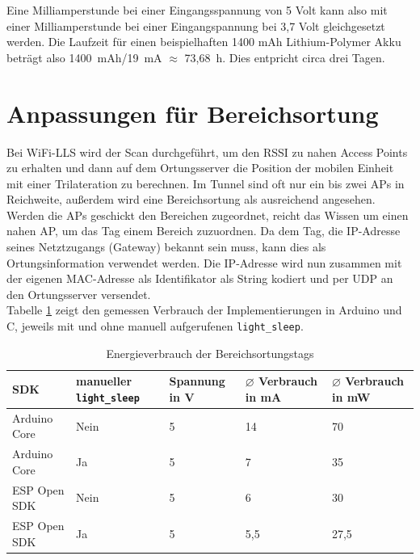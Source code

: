 Eine Milliamperstunde bei einer Eingangsspannung von 5 Volt kann also mit einer Milliamperstunde bei einer Eingangspannung bei 3,7 Volt gleichgesetzt werden.
Die Laufzeit für einen beispielhaften 1400 mAh Lithium-Polymer Akku beträgt also 1400\ mAh/19\ mA $\approx$ 73,68\ h.
Dies entpricht circa drei Tagen.


\section{Anpassungen für Bereichsortung}
\label{ch:phase1:sec:anpassungbereich}
Bei WiFi-LLS wird der Scan durchgeführt, um den RSSI zu nahen Access Points zu erhalten und dann auf dem Ortungsserver die Position der mobilen Einheit mit einer Trilateration zu berechnen.
Im Tunnel sind oft nur ein bis zwei APs in Reichweite, außerdem wird eine Bereichsortung als ausreichend angesehen. \\
Werden die APs geschickt den Bereichen zugeordnet, reicht das Wissen um einen nahen AP, um das Tag einem Bereich zuzuordnen.
Da dem Tag, die IP-Adresse seines Netztzugangs (Gateway) bekannt sein muss, kann dies als Ortungsinformation verwendet werden.
Die IP-Adresse wird nun zusammen mit der eigenen MAC-Adresse als Identifikator als String kodiert und per UDP an den Ortungsserver versendet.\\
Tabelle \ref{table:naiveconsumption} zeigt den gemessen Verbrauch der Implementierungen in Arduino und C, jeweils mit und ohne manuell aufgerufenen \texttt{light\_sleep}.

\begin{table}[h]
	\centering
	\caption{Energieverbrauch der Bereichsortungstags}
	\label{table:naiveconsumption}
	\begin{tabular}{p{3cm}|p{2.2cm}|p{1.7cm}|p{2.5cm}|p{2.5cm}}
		SDK & manueller \texttt{light\_sleep} & Spannung in V & $\varnothing$ Verbrauch in mA & $\varnothing$ Verbrauch in mW \\
		\hline
		Arduino Core & Nein & 5 & 14 & 70 \\
		Arduino Core & Ja & 5 & 7 & 35 \\
		ESP Open SDK & Nein & 5 & 6 & 30 \\
		ESP Open SDK & Ja & 5 & 5,5 & 27,5 \\
	\end{tabular}
\end{table}

